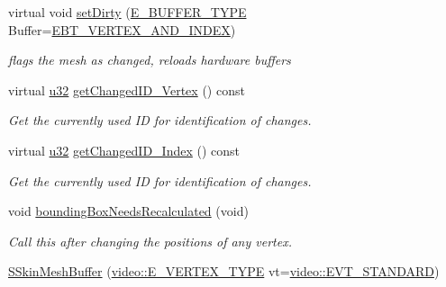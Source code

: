 \begin{DoxyCompactItemize}
\mbox{\label{structirr_1_1scene_1_1SSkinMeshBuffer_ae4c0ce6333329191929e2023c9727a3a}} 
virtual void \hyperlink{structirr_1_1scene_1_1SSkinMeshBuffer_ae4c0ce6333329191929e2023c9727a3a}{set\+Dirty} (\hyperlink{namespaceirr_1_1scene_a8f59a89ffef0ad8e5b2c2cb874a93e8c}{E\+\_\+\+B\+U\+F\+F\+E\+R\+\_\+\+T\+Y\+PE} Buffer=\hyperlink{namespaceirr_1_1scene_a8f59a89ffef0ad8e5b2c2cb874a93e8ca34ea664123fbc28610408e51b014dcdd}{E\+B\+T\+\_\+\+V\+E\+R\+T\+E\+X\+\_\+\+A\+N\+D\+\_\+\+I\+N\+D\+EX})
\begin{DoxyCompactList}\small\item\em flags the mesh as changed, reloads hardware buffers \end{DoxyCompactList}\item 
virtual \hyperlink{namespaceirr_a0416a53257075833e7002efd0a18e804}{u32} \hyperlink{structirr_1_1scene_1_1SSkinMeshBuffer_a94faa430425d73fbb6cab74ac65af1c1}{get\+Changed\+I\+D\+\_\+\+Vertex} () const
\begin{DoxyCompactList}\small\item\em Get the currently used ID for identification of changes. \end{DoxyCompactList}\item 
virtual \hyperlink{namespaceirr_a0416a53257075833e7002efd0a18e804}{u32} \hyperlink{structirr_1_1scene_1_1SSkinMeshBuffer_a60b444cfe4b0cec6d2cc4bdf7958dd16}{get\+Changed\+I\+D\+\_\+\+Index} () const
\begin{DoxyCompactList}\small\item\em Get the currently used ID for identification of changes. \end{DoxyCompactList}\item 
\mbox{\label{structirr_1_1scene_1_1SSkinMeshBuffer_af3460f6a2bb4b53b60d03d162f0d6fa6}} 
void \hyperlink{structirr_1_1scene_1_1SSkinMeshBuffer_af3460f6a2bb4b53b60d03d162f0d6fa6}{bounding\+Box\+Needs\+Recalculated} (void)
\begin{DoxyCompactList}\small\item\em Call this after changing the positions of any vertex. \end{DoxyCompactList}\item 
\mbox{\label{structirr_1_1scene_1_1SSkinMeshBuffer_aa80de8556499e8038b037ea39e702b93}} 
\hyperlink{structirr_1_1scene_1_1SSkinMeshBuffer_aa80de8556499e8038b037ea39e702b93}{S\+Skin\+Mesh\+Buffer} (\hyperlink{namespaceirr_1_1video_a0e3b59e025e0d0db0ed2ee0ce904deac}{video\+::\+E\+\_\+\+V\+E\+R\+T\+E\+X\+\_\+\+T\+Y\+PE} vt=\hyperlink{namespaceirr_1_1video_a0e3b59e025e0d0db0ed2ee0ce904deaca921f287a4f48d612a5be2d89453ca262}{video\+::\+E\+V\+T\+\_\+\+S\+T\+A\+N\+D\+A\+RD})

\end{DoxyCompactItemize}
